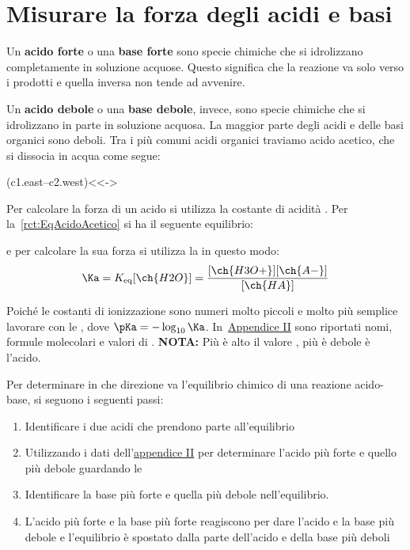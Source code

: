\section{Misurare la forza degli acidi e basi}
Un \textbf{acido forte} o una \textbf{base forte} sono specie chimiche che si idrolizzano completamente in soluzione acquose. Questo significa che la reazione va solo verso i prodotti e quella inversa non tende ad avvenire.

Un \textbf{acido debole} o una \textbf{base debole}, invece, sono specie chimiche che si idrolizzano in parte in soluzione acquosa. La maggior parte degli acidi e delle basi organici sono deboli. Tra i più comuni acidi organici traviamo acido acetico, che si dissocia in acqua come segue:

\begingroup
\begin{reaction}
	 \+  
	\arrow(c1.east--c2.west){<<->}
	 \+ 
\end{reaction}
\label{rct:EqAcidoAcetico}
\endgroup

Per calcolare la forza di un acido si utilizza la costante di acidità \Ka. Per la~\autoref{rct:EqAcidoAcetico} si ha il seguente equilibrio:

\begin{center}
\end{center}
e per calcolare la sua forza si utilizza la \Ka in questo modo:
\begin{equation*}
	\Ka = K_{\text{eq}}[\ch{H2O}] = \frac{[\ch{H3O+}][\ch{A-}]}{[\ch{HA}]}
\end{equation*}

Poiché le costanti di ionizzazione sono numeri molto piccoli e molto più semplice lavorare con le \pKa, dove \(\pKa=-\log_{10} \Ka\). In~\hyperref[ap:acidi.basi]{Appendice II} sono riportati nomi, formule molecolari e valori di \pKa. \textbf{NOTA:} Più è alto il valore \pKa, più è debole è l'acido.

Per determinare in che direzione va l'equilibrio chimico di una reazione acido-base, si seguono i seguenti passi:
\begin{enumerate}
	\item Identificare i due acidi che prendono parte all'equilibrio
	\item Utilizzando i dati dell'\hyperref[ap:acidi.basi]{appendice II} per determinare l'acido più forte e quello più debole guardando le \Ka
	\item Identificare la base più forte e quella più debole nell'equilibrio.
	\item L'acido più forte e la base più forte reagiscono per dare l'acido e la base più debole e l'equilibrio è spostato dalla parte dell'acido e della base più deboli
\end{enumerate}